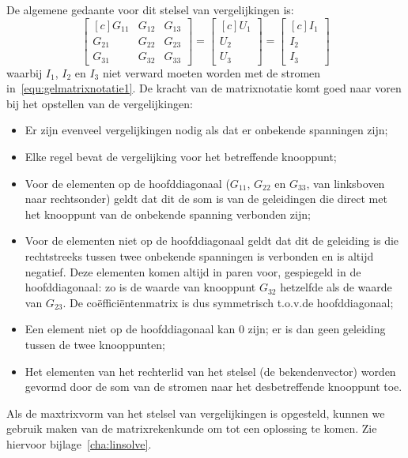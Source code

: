 De algemene gedaante voor dit stelsel van vergelijkingen is:
%
\begin{equation}
\begin{bmatrix*}[c]
G_{11} & G_{12} & G_{13} \\
G_{21} & G_{22} & G_{23} \\
G_{31} & G_{32} & G_{33}
\end{bmatrix*} = 
\begin{bmatrix*}[c]
U_1 \\ U_2 \\ U_3
\end{bmatrix*} =
\begin{bmatrix*}[c]
I_1 \\ I_2 \\ I_3
\end{bmatrix*}
\end{equation}
%
waarbij $I_1$, $I_2$ en $I_3$ niet verward moeten worden met de stromen in~\eqref{equ:gelmatrixnotatie1}.
De kracht van de matrixnotatie komt goed naar voren bij het opstellen van de vergelijkingen:

\begin{itemize}
\item Er zijn evenveel vergelijkingen nodig als dat er onbekende spanningen zijn;
\item Elke regel bevat de vergelijking voor het betreffende knooppunt;
\item Voor de elementen op de hoofddiagonaal ($G_{11}$, $G_{22}$ en $G_{33}$, van linksboven naar rechtsonder) geldt dat dit de som is van de geleidingen die direct met het knooppunt van de onbekende spanning verbonden zijn;
\item Voor de elementen niet op de hoofddiagonaal geldt dat dit de geleiding is die rechtstreeks tussen twee onbekende spanningen is verbonden en is altijd negatief. Deze elementen komen altijd in paren voor, gespiegeld in de hoofddiagonaal: zo is de waarde van knooppunt $G_{32}$ hetzelfde als de waarde van $G_{23}$. De coëfficiëntenmatrix is dus symmetrisch t.o.v.\@ de hoofddiagonaal;
\item Een element niet op de hoofddiagonaal kan 0 zijn; er is dan geen geleiding tussen de twee knooppunten;
\item Het elementen van het rechterlid van het stelsel (de bekendenvector) worden gevormd door de som van de stromen naar het desbetreffende knooppunt toe.
\end{itemize}

Als de maxtrixvorm van het stelsel van vergelijkingen is opgesteld, kunnen we gebruik maken van de matrixrekenkunde om tot een oplossing te komen. Zie hiervoor bijlage~\ref{cha:linsolve}.

